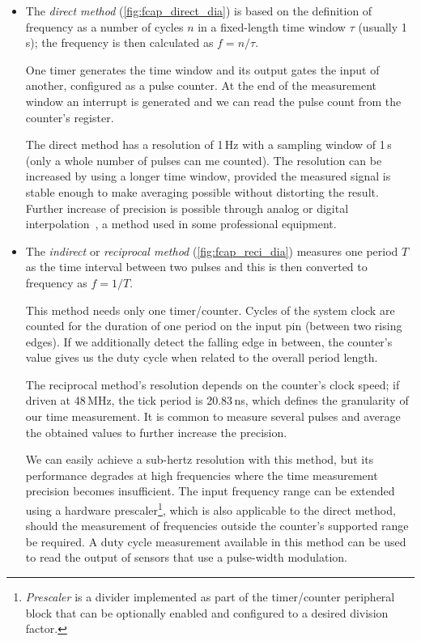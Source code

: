 \begin{itemize}
	\item The \textit{direct method} (\cref{fig:fcap_direct_dia}) is based on the definition of frequency as a number of cycles $n$ in a fixed-length time window $\tau$ (usually 1\,s); the frequency is then calculated as $f=n/\tau$.

	One timer generates the time window and its output gates the input of another, configured as a pulse counter. At the end of the measurement window an interrupt is generated and we can read the pulse count from the counter's register.

	The direct method has a resolution of 1\,Hz with a sampling window of 1\,s (only a whole number of pulses can me counted). The resolution can be increased by using a longer time window, provided the measured signal is stable enough to make averaging possible without distorting the result. Further increase of precision is possible through analog or digital interpolation~\cite{fcap-increasing}, a method used in some professional equipment.

	\item The \textit{indirect} or \textit{reciprocal method} (\cref{fig:fcap_reci_dia}) measures one period $T$ as the time interval between two pulses and this is then converted to frequency as $f=1/T$.

	This method needs only one timer/counter. Cycles of the system clock are counted for the duration of one period on the input pin (between two rising edges). If we additionally detect the falling edge in between, the counter's value gives us the duty cycle when related to the overall period length.

	The reciprocal method's resolution depends on the counter's clock speed; if driven at 48\,MHz, the tick period is 20.83\,ns, which defines the granularity of our time measurement. It is common to measure several pulses and average the obtained values to further increase the precision.

	We can easily achieve a sub-hertz resolution with this method, but its performance degrades at high frequencies where the time measurement precision becomes insufficient. The input frequency range can be extended using a hardware prescaler\footnote{\textit{Prescaler} is a divider implemented as part of the timer/counter peripheral block that can be optionally enabled and configured to a desired division factor.}, which is also applicable to the direct method, should the measurement of frequencies outside the counter's supported range be required. A duty cycle measurement available in this method can be used to read the output of sensors that use a pulse-width modulation.

\end{itemize}

